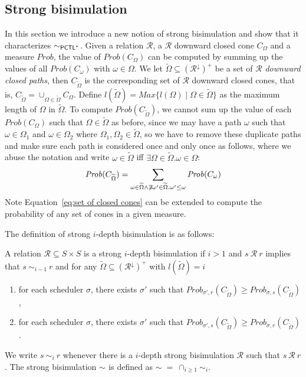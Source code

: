 \documentclass{LMCS}
\def\tilde{\widetilde}
\newcommand{\PCTL}{{\sf PCTL}}
\newcommand{\iBS}[1]{\sim_{#1}}
\newcommand{\EPCTLS}{\sim_{\PCTL^{*}}}
\newcommand{\MC}[1]{\mathcal{#1}}
\newcommand{\MEASURE}{\mathit{Prob}}
\newcommand{\DOWNWARD}[2]{#1^{\downarrow}#2}
\begin{document}
\subsection{Strong bisimulation}\label{sec:i depth bisimulation}
In this section we introduce a new notion of strong bisimulation and show that it
characterizes $\EPCTLS$. Given  a relation  $\MC{R}$, a $\MC{R}$ downward closed cone $C_{\Omega}$ and
a measure $\MEASURE$, the value of
$\MEASURE(C_{\Omega})$ can be computed by summing up the values of all
$\MEASURE(C_{\omega})$ with $\omega\in\Omega$. We let
$\tilde{\Omega}\subseteq(\DOWNWARD{\MC{R}}{})^+$ be a set of
$\MC{R}$ \emph{downward closed paths}, then $C_{\tilde{\Omega}}$ is the
corresponding set of $\MC{R}$ downward closed cones, that is,
$C_{\tilde{\Omega}}=\mathop{\cup}_{\Omega\in\tilde{\Omega}}C_{\Omega}$. Define $l(\tilde{\Omega})=\mathit{Max}\{l(\Omega)\mid\Omega\in\tilde{\Omega}\}$
as the maximum length of $\Omega$ in $\tilde{\Omega}$. To
compute $\MEASURE(C_{\tilde{\Omega}})$, we cannot sum up the value of each
$\MEASURE(C_{\Omega})$ such that $\Omega\in\tilde{\Omega}$ as before, since we
may have a path $\omega$ such that $\omega\in\Omega_1$ and
$\omega\in\Omega_2$ where $\Omega_1,\Omega_2\in\tilde{\Omega}$, so we
have to remove these duplicate paths and make sure each path is
considered once and only once as follows,
where we abuse the notation and write $\omega\in\tilde{\Omega}$ iff $\exists\Omega\in\tilde{\Omega}.\omega\in\Omega$:
\begin{equation}\label{eq:set of closed cones}
\MEASURE(C_{\tilde{\Omega}}) = \mathop{\sum}\limits_{\omega\in\tilde{\Omega}\land\not\exists\omega'\in\tilde{\Omega}.\omega'\leq\omega}\MEASURE(C_{\omega})
\end{equation}
Note Equation~\ref{eq:set of closed cones}  can be extended to compute the probability of any set of cones in a given measure.

The definition of strong $i$-depth bisimulation is as follows:
\begin{defi}\label{def:index strong bisimulation}
A relation $\MC{R}\subseteq S\times S$ is a
strong $i$-depth bisimulation if $i>1$ and $s~\MC{R}~r$ implies that $s~\iBS{i-1}~r$ and for any $\tilde{\Omega}\subseteq (\DOWNWARD{\MC{R}}{})^+$ with $l(\tilde{\Omega})=i$
\begin{enumerate}[(1)]
\item for each scheduler $\sigma$, there exists $\sigma'$ such that $\MEASURE_{\sigma',r}(C_{\tilde{\Omega}})\geq\MEASURE_{\sigma,s}(C_{\tilde{\Omega}})$,
\item for each scheduler $\sigma$, there exists $\sigma'$ such that $\MEASURE_{\sigma',s}(C_{\tilde{\Omega}})\geq\MEASURE_{\sigma,r}(C_{\tilde{\Omega}})$.
\end{enumerate}

We write $s~\iBS{i}~r$ whenever there is a $i$-depth strong bisimulation $\MC{R}$ such that $s~\MC{R}~r$. The strong bisimulation $\iBS{}$ is defined as $\iBS{}\ =\ \cap_{i\ge 1} \iBS{i}$.
\end{defi}
\end{document}

